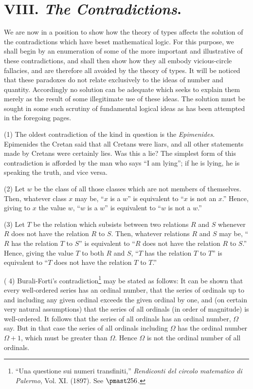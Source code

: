 \documentclass[letterpaper,12pt,openany,leqno]{book}
\newcommand{\pagefirst}[1]{\marginnote[\boxed{\text{#1}}]{\boxed{\text{#1}}}}
\begin{document}
\section*{\centering VIII. \textit{The Contradictions}.} \pagefirst{63} 

We are now in a position to show how the theory of types affects the solution of the contradictions which have beset mathematical logic. For this purpose, we shall begin by an enumeration of some of the more important and illustrative of these contradictions, and shall then show how they all embody vicious-circle fallacies, and are therefore all avoided by the theory of types. It will be noticed that these paradoxes do not relate exclusively to the ideas of number and quantity. Accordingly no solution can be adequate which seeks to explain them merely as the result of some illegitimate use of these ideas. The solution must be sought in some such scrutiny of fundamental logical ideas as has been attempted in the foregoing pages.

(1) The oldest contradiction of the kind in question is the \textit{Epimenides}. Epimenides the Cretan said that all Cretans were liars, and all other statements made by Cretans were certainly lies. Was this a lie? The simplest form of this contradiction is afforded by the man who says ``I am lying''; if he is lying, he is speaking the truth, and vice versa. 

(2) Let $w$ be the class of all those classes which are not members of themselves. Then, whatever class $x$ may be, ``$x$ is a $w$'' is equivalent to ``$x$ is not an $x$.'' Hence, giving to $x$ the value $w$, ``$w$ is a $w$'' is equivalent to ``$w$ is not a $w$.''

(3) Let $T$ be the relation which subsists between two relations $R$ and $S$ whenever $R$ does not have the relation $R$ to $S$. Then, whatever relations $R$ and $S$ may be, ``$R$ has the relation $T$ to $S$'' is equivalent to ``$R$ does not have the relation $R$ to $S$.'' Hence, giving the value $T$ to both $R$ and $S$, ``$T$ has the relation $T$ to $T$'' is equivalent to ``$T$ does not have the relation $T$ to $T$.''

( 4) Burali-Forti's contradiction\footnote{``Una questione sui numeri transfiniti,'' \textit{Rendiconti del circolo matematico di Palermo}, Vol. XI. (1897). See $\pmast256$.} may be stated as follows: It can be shown that every well-ordered series has an ordinal number, that the series of ordinals up to and including any given ordinal exceeds the given ordinal by one, and (on certain very natural assumptions) that the series of all ordinals (in order of magnitude) is well-ordered. It follows that the series of all ordinals has an ordinal number, $\Omega$ say. But in that case the series of all ordinals including $\Omega$ has the ordinal number $\Omega+1$, which must be greater than $\Omega$. Hence $\Omega$ is not the ordinal number of all ordinals.
\end{document}
